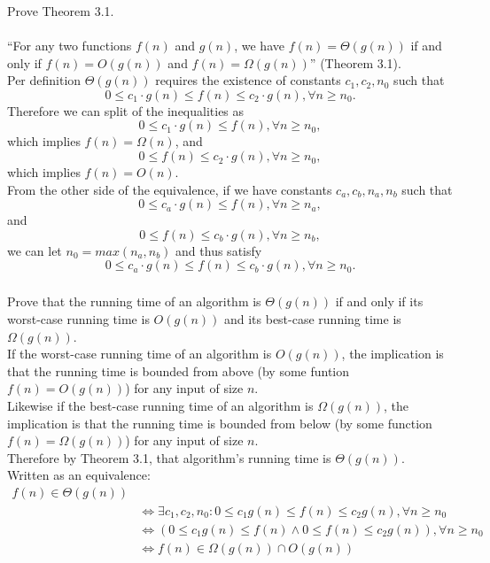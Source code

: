 \documentclass[11pt]{article}
\numberwithin{equation}{section}
\renewcommand{\iff}{\Leftrightarrow}
\begin{document}
\subsubsection{}
Prove Theorem 3.1.
~\\~\\
``For any two functions $f(n)$ and $g(n)$, we have $f(n) = \Theta(g(n))$
if and only if $f(n) = O(g(n))$ and $f(n) = \Omega(g(n))$'' (Theorem 3.1).\\

Per definition $\Theta(g(n))$ requires the existence of constants $c_1, c_2, n_0$ 
such that \[0 \leq c_1 \cdot g(n) \leq f(n) \leq c_2 \cdot g(n), \forall n \geq n_0.\]
Therefore we can split of the inequalities as 
\[0 \leq c_1 \cdot g(n) \leq f(n), \forall n \geq n_0,\] which implies $f(n) = \Omega(n)$, and
\[0 \leq f(n) \leq c_2 \cdot g(n), \forall n \geq n_0,\] which implies $f(n) = O(n)$.\\

From the other side of the equivalence, if we have constants $c_a, c_b, n_a, n_b$ such that
\[0 \leq c_a \cdot g(n) \leq f(n), \forall n \geq n_a,\] and
\[0 \leq f(n) \leq c_b \cdot g(n), \forall n \geq n_b,\]
we can let $n_0 = max(n_a, n_b)$ and thus satisfy 
\[0 \leq c_a \cdot g(n) \leq f(n) \leq c_b \cdot g(n), \forall n \geq n_0.\]

\subsubsection{}
Prove that the running time of an algorithm is $\Theta(g(n))$ if and only if 
its worst-case running time is $O(g(n))$ and its best-case running time 
is $\Omega(g(n))$.\\

If the worst-case running time of an algorithm is $O(g(n))$, the implication
is that the running time is bounded from above (by some funtion $f(n) = O(g(n))$)
for any input of size $n$.\\
Likewise if the best-case running time of an algorithm is $\Omega(g(n))$, the
implication is that the running time is bounded from below (by some function
$f(n) = \Omega(g(n))$) for any input of size $n$.\\
Therefore by Theorem 3.1, that algorithm's running time is $\Theta(g(n))$.\\

Written as an equivalence:
~\\
\begin{equation*}
    \begin{split}
         f(n) \in \Theta(g(n))\\
        & \iff \exists c_1, c_2, n_0 : 0 \leq c_1 g(n) \leq 
            f(n) \leq c_2 g(n), \forall n \geq n_0\\
        & \iff (0 \leq c_1 g(n)
            \leq f(n) \land 0 \leq f(n) \leq c_2 g(n)), \forall n \geq n_0\\
        & \iff f(n) \in \Omega(g(n)) \cap O(g(n))\\
    \end{split}
\end{equation*}
\end{document}
